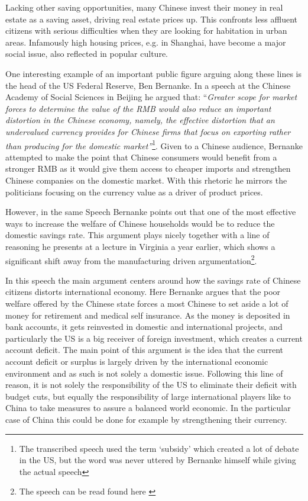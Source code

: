 Lacking other saving opportunities, many Chinese invest their money in 
real estate as a saving asset, driving real estate prices up.  This 
confronts less affluent citizens with serious difficulties when they are 
looking for habitation in urban areas.  Infamously high housing prices, 
e.g.  in Shanghai, have become a major social issue, also reflected in 
popular culture. 

One interesting example of an important public figure arguing along 
these lines is the head of the US Federal Reserve, Ben Bernanke. In a 
speech at the Chinese Academy of Social Sciences in Beijing he argued 
that: ``\textit{Greater scope for market forces to determine the value 
	of the RMB would also reduce an important distortion in the Chinese 
	economy, namely, the effective distortion that an undervalued 
	currency provides for Chinese firms that focus on exporting rather 
than producing for the domestic market''}\footnote{The transcribed 
	speech \cite{Bernanke06} used the term `subsidy' which created a lot 
	of debate in the US, but the word was never uttered by Bernanke 
himself while giving the actual speech\cite{reuters06}}. Given to a 
Chinese audience, Bernanke attempted to make the point that Chinese 
consumers would benefit from a stronger RMB as it would give them access 
to cheaper imports and strengthen Chinese companies on the domestic 
market. With this rhetoric he mirrors the politicians focusing on the 
currency value as a driver of product prices.

However, in the same Speech Bernanke points out that one of the most 
effective ways to increase the welfare of Chinese households would be to 
reduce the domestic savings rate. This argument plays nicely together 
with a line of reasoning he presents at a lecture in Virginia a year 
earlier, which shows a significant shift away from the manufacturing 
driven argumentation\footnote{The speech can be read found here 
\cite{Bernanke05}}.

In this speech the main argument centers around how the savings rate 
of Chinese citizens distorts international economy. Here Bernanke argues 
that the poor welfare offered by the Chinese state forces a most Chinese 
to set aside a lot of money for retirement and medical self insurance.  
As the money is deposited in bank accounts, it gets reinvested in 
domestic and international projects, and particularly the US is a big 
receiver of foreign investment, which creates a current account deficit.  
The main point of this argument is the idea that the current account 
deficit or surplus is largely driven by the international economic 
environment and as such is not solely a domestic issue. Following this 
line of reason, it is not solely the responsibility of the US to 
eliminate their deficit with budget cuts, but equally the responsibility 
of large international players like to China to take measures to assure 
a balanced world economic. In the particular case of China this could be 
done for example by strengthening their currency.

